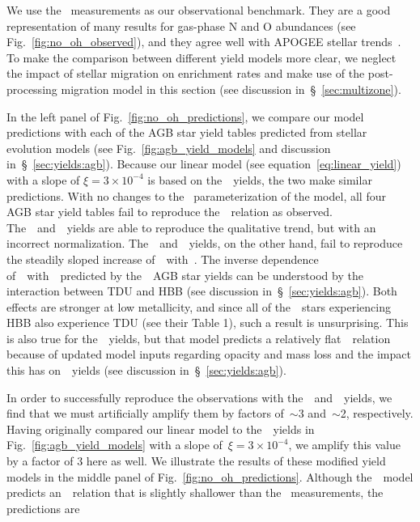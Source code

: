 \documentclass[ms.tex]{subfiles}
\begin{document}
We use the~\citet{Dopita2016} measurements as our observational benchmark.
They are a good representation of many results for gas-phase N and O abundances
(see Fig.~\ref{fig:no_oh_observed}), and they agree well with APOGEE stellar
trends~\citep{Vincenzo2021}.
To make the comparison between different yield models more clear, we neglect
the impact of stellar migration on enrichment rates and make use of the
post-processing migration model in this section (see discussion
in~\S~\ref{sec:multizone}).
\par
In the left panel of Fig.~\ref{fig:no_oh_predictions}, we compare our model
predictions with each of the AGB star yield tables predicted from stellar
evolution models (see Fig.~\ref{fig:agb_yield_models} and discussion
in~\S~\ref{sec:yields:agb}).
Because our linear model (see equation~\ref{eq:linear_yield}) with a slope of
$\xi = 3\times10^{-4}$ is based on the~\cristallo~yields, the two make similar
predictions.
With no changes to the~\citet{Johnson2021} parameterization of the model, all
four AGB star yield tables fail to reproduce the~\ohno~relation as observed.
The~\cristallo~and~\ventura~yields are able to reproduce the qualitative trend,
but with an incorrect normalization.
The~\karakasten~and~\karakas~yields, on the other hand, fail to reproduce
the steadily sloped increase of~\no~with~\oh.
The inverse dependence of~\no~with~\oh~predicted by the~\karakasten~AGB star
yields can be understood by the interaction between TDU and HBB (see discussion
in~\S~\ref{sec:yields:agb}).
Both effects are stronger at low metallicity, and since all of
the~\karakasten~stars experiencing HBB also experience TDU (see their Table 1),
such a result is unsurprising.
This is also true for the~\karakas~yields, but that model predicts a
relatively flat~\ohno~relation because of updated model inputs regarding
opacity and mass loss and the impact this has on~\Nfourteen~yields (see
discussion in~\S~\ref{sec:yields:agb}).
\par
In order to successfully reproduce the observations with
the~\cristallo~and~\ventura~yields, we find that we must artificially amplify
them by factors of~$\sim$3 and~$\sim$2, respectively.
Having originally compared our linear model to the~\cristallo~yields in
Fig.~\ref{fig:agb_yield_models} with a slope of~$\xi = 3\times10^{-4}$, we
amplify this value by a factor of 3 here as well.
We illustrate the results of these modified yield models in the middle panel
of Fig.~\ref{fig:no_oh_predictions}.
Although the~\ventura~model predicts an~\ohno~relation that is slightly
shallower than the~\citet{Dopita2016} measurements, the predictions are
\end{document}
